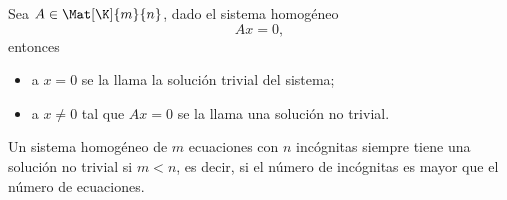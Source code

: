 \documentclass[a4,11pt]{aleph-notas}
\begin{document}
\begin{defi}
    Sea $A\in \Mat[\K]{m}{n}$, dado el sistema homogéneo
    \[ 
        Ax = 0,
    \]
    entonces
    \begin{itemize}
    \item 
        a $x = 0$ se la llama la solución trivial del sistema;
    \item 
        a $x \neq 0$ tal que $Ax=0$ se la llama una solución no trivial. 
    \end{itemize}
\end{defi}

\begin{teo}
    Un sistema homogéneo de $m$ ecuaciones con $n$ incógnitas siempre tiene una solución no trivial si $m<n$, es decir, si el número de incógnitas es mayor que el número de ecuaciones. 
\end{teo}
\end{document}
